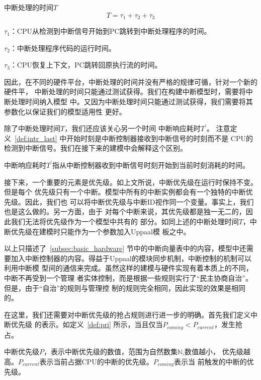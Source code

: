 \begin{definition}
	中断处理的时间$T$
	\label{def:intr_time}
	\begin{equation}
		T = \tau_1 + \tau_2 + \tau_3
	\end{equation}
	
	$\tau_1$：CPU从检测到中断信号开始到PC跳转到中断处理程序的时间。
	
	$\tau_2$：中断处理程序代码的运行时间。
	
	$\tau_3$：CPU恢复上下文，PC跳转回原执行流的时间。
\end{definition}

因此，在不同的硬件平台，中断处理的时间并没有严格的规律可循，针对一个新的硬件平，
中断处理的时间只能通过测试获得。我们在构建中断模型时，需要将中断处理时间纳入模型
中。又因为中断处理时间只能通过测试获得，我们需要将其参数化以保证我们的模型适用性
更好。

除了中断处理时间$T$，我们还应该关心另一个时间 \pozhehao 中断响应耗时$T^\prime$。
注意定义~\ref{def:intr_last} 中开始时刻是中断控制器接收到中断信号的时刻而不是
CPU的检测到中断信号。我们在接下来的建模中会解释这个区别。

\begin{definition}
	中断响应耗时$T^\prime$指从中断控制器收到中断信号时刻开始到当前时刻消耗的时间。
	\label{def:intr_last}
\end{definition}

接下来，一个重要的元素是优先级。如上文所说，中断优先级在运行时保持不变。但是每个
优先级只有一个中断。模型中所有的中断实例都会有一个独特的中断优先级。因此，我们也
可以将中断优先级与中断ID视作同一个变量。事实上，我们也是这么做的。另一方面，由于
对每个中断来说，其优先级都是独一无二的，因此我们无法将优先级作为一个模型中共有的
部分。如同上述的中断处理时间$T$，中断优先级在建模时只能作为一个参数加入Uppaal模
板之中。

以上只描述了~\ref{subsec:basic_hardware} 节中的中断向量表中的内容，模型中还需
要加入中断控制器的内容。得益于Uppaal的模块同步机制，中断控制的机制可以利用中断模
型间的通信来完成。虽然这样的建模与硬件实现有着本质上的不同，中断不再受到一个管理
者实体控制，而是根据一些规则实行了“民主协商自治”。但是，由于“自治”的规则与管理控
制的规则完全相同，因此实现的效果是相同的。

在这里，我们还需要对中断优先级的抢占规则进行进一步的明确。首先我们定义中断优先级
的表示。如定义~\ref{def:pri} 所示，当且仅当$P_{coming} < P_{current}$，发生抢
占。

\begin{definition}
	中断优先级$P$，表示中断优先级的数值，范围为自然数集$\mathbb{N}$,数值越小，
	优先级越高。$P_{current}$表示当前占据CPU的中断的优先级。$P_{coming}$表示当
	前触发的中断的优先级。
	\label{def:pri}
\end{definition}

